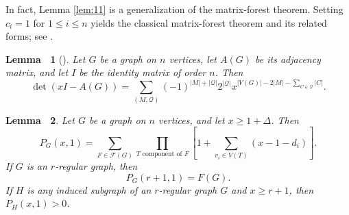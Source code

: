 \documentclass[11pt, a4paper]{article}
\theoremstyle{plain}
\newtheorem{lemma}{Lemma\ }[section]
\begin{document}
In fact, Lemma \ref{lem:11} is a generalization of the matrix-forest theorem.
Setting $c_i=1$ for $1\leq i\leq n$
yields the classical matrix-forest theorem and its related forms; see \cite{Chebotarev1997}.
\begin{lemma}[\cite{Harary1962, Sachs1964}]
Let $G$ be a graph on $n$ vertices, let $A(G)$ be its adjacency matrix, and let $I$ be the identity matrix of order $n$.
Then
\begin{equation}\label{eq:4}
\det(xI-A(G))
=
\sum_{(M, \mathcal{Q})}
(-1)^{|M|+|\mathcal{Q}|}2^{|\mathcal{Q}|}
x^{|V(G)|-2|M|-\sum_{C\in \mathcal{Q}}|C|}.
\end{equation}
\end{lemma}
\begin{lemma}\label{lem:forest-identity}
Let $G$ be a graph on $n$ vertices, and let $x\geq 1+\Delta$.
Then
\begin{equation}\label{eq:forest-identity}
 P_G(x,1)
 =\sum_{F\in\mathcal{F}(G)}
   \prod_{T \text{ component of } F}
   \left[1+\sum_{v_i\in V(T)}(x-1-d_i)\right].
\end{equation}
If $G$ is an $r$-regular graph, then
\begin{equation}\label{eq:F-exact}
 P_G(r+1,1)=F(G).
\end{equation}
If $H$ is any induced subgraph of an $r$-regular graph $G$ and $x\geq r+1$, then $P_H(x,1)>0$.
\end{lemma}
\end{document}
